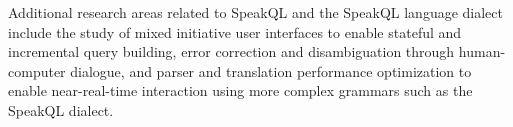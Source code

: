 Additional research areas related to SpeakQL and the SpeakQL language dialect include the study of mixed initiative user interfaces to enable stateful and incremental query building, error correction and disambiguation through human-computer dialogue, and parser and translation performance optimization to enable near-real-time interaction using more complex grammars such as the SpeakQL dialect.

